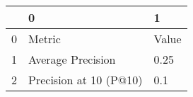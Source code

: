 \begin{tabular}{lll}
\toprule
{} &                       0 &      1 \\
\midrule
0 &                  Metric &  Value \\
1 &       Average Precision &   0.25 \\
2 &  Precision at 10 (P@10) &    0.1 \\
\bottomrule
\end{tabular}
